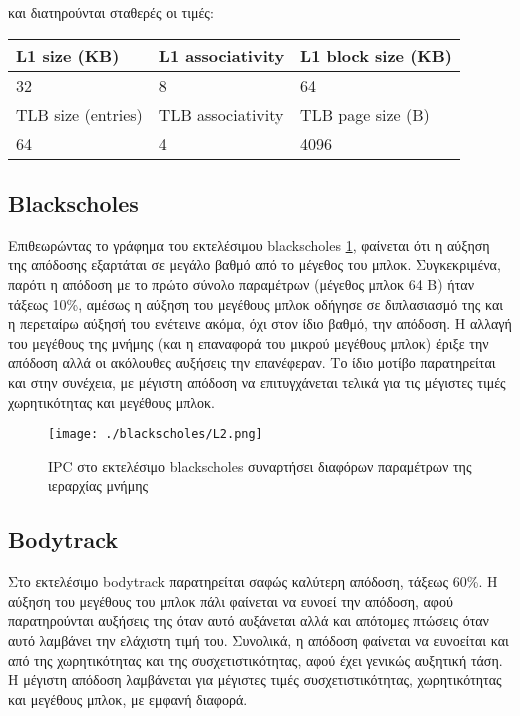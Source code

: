 \documentclass{article}
\newcommand{\eng}[1]{\foreignlanguage{english}{#1}}
\begin{document}
και διατηρούνται σταθερές οι τιμές:

\begin{table}[h]
    \centering
    \begin{tabular}{|p{3cm}|p{3cm}|p{3cm}|}
        \hline
        L1 size (KB) & L1 associativity & L1 block size (KB)\\
        \hline
        \hline
        32 & 8 & 64\\
        \hline
        TLB size (entries) & TLB associativity & TLB page size (B)\\
        \hline    
        \hline
        64 & 4 & 4096\\
        \hline
    \end{tabular}
\end{table}

\graphicspath{{../parsec-3.0/parsec_workspace/outputs/exp2/}}

\subsection{\eng{Blackscholes}}

Επιθεωρώντας το γράφημα του εκτελέσιμου \eng{blackscholes} \ref{fig:exp2-blackscholes}, φαίνεται ότι η αύξηση της απόδοσης εξαρτάται σε μεγάλο βαθμό από το μέγεθος του μπλοκ. Συγκεκριμένα, παρότι η απόδοση με το πρώτο σύνολο παραμέτρων (μέγεθος μπλοκ 64 Β) ήταν τάξεως 10\%, αμέσως η αύξηση του μεγέθους μπλοκ οδήγησε σε διπλασιασμό της και η περεταίρω αύξησή του ενέτεινε ακόμα, όχι στον ίδιο βαθμό, την απόδοση. Η αλλαγή του μεγέθους της μνήμης (και η επαναφορά του μικρού μεγέθους μπλοκ) έριξε την απόδοση αλλά οι ακόλουθες αυξήσεις την επανέφεραν. Το ίδιο μοτίβο παρατηρείται και στην συνέχεια, με μέγιστη απόδοση να επιτυγχάνεται τελικά για τις μέγιστες τιμές χωρητικότητας και μεγέθους μπλοκ.

\begin{figure}[h]
    \centering
    \texttt{[image: ./blackscholes/L2.png]} 
    \caption{\eng{IPC} στο εκτελέσιμο \eng{blackscholes} συναρτήσει διαφόρων παραμέτρων της ιεραρχίας μνήμης}
    \label{fig:exp2-blackscholes}
\end{figure}
\FloatBarrier

\subsection{\eng{Bodytrack}}

Στο εκτελέσιμο \eng{bodytrack} παρατηρείται σαφώς καλύτερη απόδοση, τάξεως 60\%. Η αύξηση του μεγέθους του μπλοκ πάλι φαίνεται να ευνοεί την απόδοση, αφού παρατηρούνται αυξήσεις της όταν αυτό αυξάνεται αλλά και απότομες πτώσεις όταν αυτό λαμβάνει την ελάχιστη τιμή του. Συνολικά, η απόδοση φαίνεται να ευνοείται και από της χωρητικότητας και της συσχετιστικότητας, αφού έχει γενικώς αυξητική τάση. Η μέγιστη απόδοση λαμβάνεται για μέγιστες τιμές συσχετιστικότητας, χωρητικότητας και μεγέθους μπλοκ, με εμφανή διαφορά. 
\end{document}
